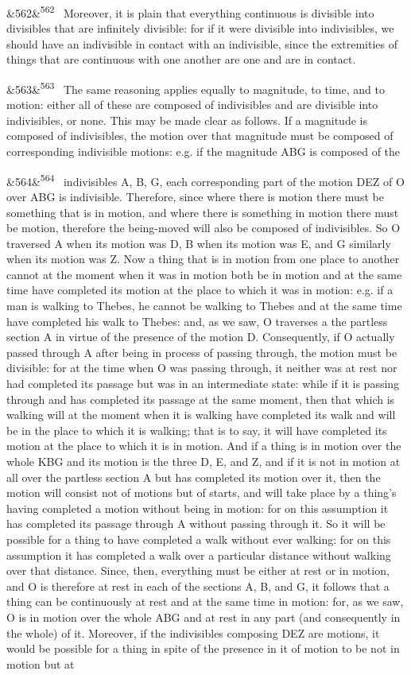 \documentclass[12pt]{article}
\newcommand{\para}[1][]{\par\noindent\ifx&#1&\else\textsuperscript{\footnotesize #1}~\fi}
\begin{document}
\para[562] Moreover, it is plain that everything continuous is divisible into divisibles that are infinitely divisible: for if it were divisible into indivisibles, we should have an indivisible in contact with an indivisible, since the extremities of things that are continuous with one another are one and are in contact.

\para[563] The same reasoning applies equally to magnitude, to time, and to motion: either all of these are composed of indivisibles and are divisible into indivisibles, or none. This may be made clear as follows. If a magnitude is composed of indivisibles, the motion over that magnitude must be composed of corresponding indivisible motions: e.g. if the magnitude ABG is composed of the

\para[564] indivisibles A, B, G, each corresponding part of the motion DEZ of O over ABG is indivisible. Therefore, since where there is motion there must be something that is in motion, and where there is something in motion there must be motion, therefore the being-moved will also be composed of indivisibles. So O traversed A when its motion was D, B when its motion was E, and G similarly when its motion was Z. Now a thing that is in motion from one place to another cannot at the moment when it was in motion both be in motion and at the same time have completed its motion at the place to which it was in motion: e.g. if a man is walking to Thebes, he cannot be walking to Thebes and at the same time have completed his walk to Thebes: and, as we saw, O traverses a the partless section A in virtue of the presence of the motion D. Consequently, if O actually passed through A after being in process of passing through, the motion must be divisible: for at the time when O was passing through, it neither was at rest nor had completed its passage but was in an intermediate state: while if it is passing through and has completed its passage at the same moment, then that which is walking will at the moment when it is walking have completed its walk and will be in the place to which it is walking; that is to say, it will have completed its motion at the place to which it is in motion. And if a thing is in motion over the whole KBG and its motion is the three D, E, and Z, and if it is not in motion at all over the partless section A but has completed its motion over it, then the motion will consist not of motions but of starts, and will take place by a thing's having completed a motion without being in motion: for on this assumption it has completed its passage through A without passing through it. So it will be possible for a thing to have completed a walk without ever walking: for on this assumption it has completed a walk over a particular distance without walking over that distance. Since, then, everything must be either at rest or in motion, and O is therefore at rest in each of the sections A, B, and G, it follows that a thing can be continuously at rest and at the same time in motion: for, as we saw, O is in motion over the whole ABG and at rest in any part (and consequently in the whole) of it. Moreover, if the indivisibles composing DEZ are motions, it would be possible for a thing in spite of the presence in it of motion to be not in motion but at 
\end{document}
